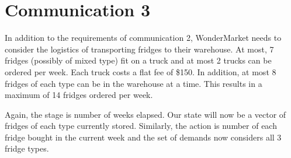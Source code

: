 \documentclass[11pt,a4paper]{article}
\begin{document}
\section{Communication 3}
In addition to the requirements of communication 2, WonderMarket 
needs to consider the logistics of transporting fridges to their warehouse. 
At most, 7 fridges (possibly of mixed type) fit on a truck and at most 2 trucks 
can be ordered per week. Each truck costs a flat fee of \$150. In 
addition, at most 8 fridges of each type can be in the warehouse at a time. 
This results in a maximum of 14 fridges ordered per week.

Again, the stage is number of weeks elapsed. Our state will now be a 
vector of fridges of each type currently stored. 
Similarly, the action is number of each fridge bought in the current week
and the set of demands now considers all 3 fridge types.
\end{document}
